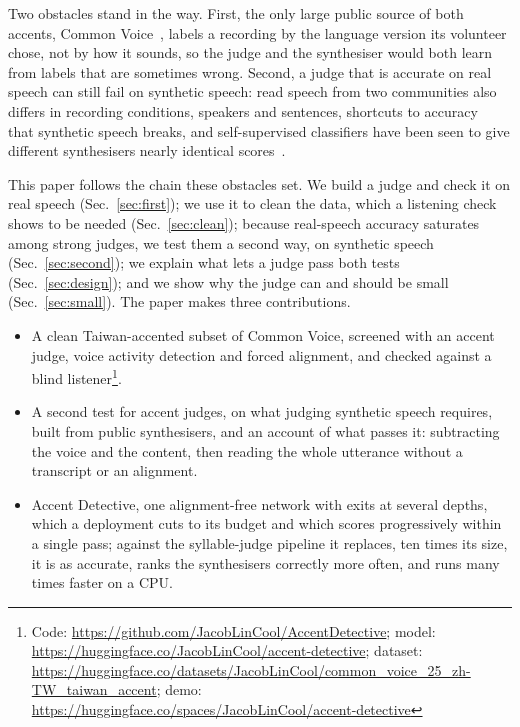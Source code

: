\documentclass{Interspeech}
\begin{document}
Two obstacles stand in the way. First, the only large public source of both accents, Common Voice~\cite{ardila2020commonvoice}, labels a recording by the language version its volunteer chose, not by how it sounds, so the judge and the synthesiser would both learn from labels that are sometimes wrong. Second, a judge that is accurate on real speech can still fail on synthetic speech: read speech from two communities also differs in recording conditions, speakers and sentences, shortcuts to accuracy~\cite{geirhos2020shortcut} that synthetic speech breaks, and self-supervised classifiers have been seen to give different synthesisers nearly identical scores~\cite{li2025scalable}.

This paper follows the chain these obstacles set. We build a judge and check it on real speech (Sec.~\ref{sec:first}); we use it to clean the data, which a listening check shows to be needed (Sec.~\ref{sec:clean}); because real-speech accuracy saturates among strong judges, we test them a second way, on synthetic speech (Sec.~\ref{sec:second}); we explain what lets a judge pass both tests (Sec.~\ref{sec:design}); and we show why the judge can and should be small (Sec.~\ref{sec:small}). The paper makes three contributions.
\begin{itemize}
\item A clean Taiwan-accented subset of Common Voice, screened with an accent judge, voice activity detection and forced alignment, and checked against a blind listener\footnote{Code: \url{https://github.com/JacobLinCool/AccentDetective}; model: \url{https://huggingface.co/JacobLinCool/accent-detective}; dataset: \url{https://huggingface.co/datasets/JacobLinCool/common_voice_25_zh-TW_taiwan_accent}; demo: \url{https://huggingface.co/spaces/JacobLinCool/accent-detective}}.
\item A second test for accent judges, on what judging synthetic speech requires, built from public synthesisers, and an account of what passes it: subtracting the voice and the content, then reading the whole utterance without a transcript or an alignment.
\item Accent Detective, one alignment-free network with exits at several depths, which a deployment cuts to its budget and which scores progressively within a single pass; against the syllable-judge pipeline it replaces, ten times its size, it is as accurate, ranks the synthesisers correctly more often, and runs many times faster on a CPU.
\end{itemize}
\end{document}
